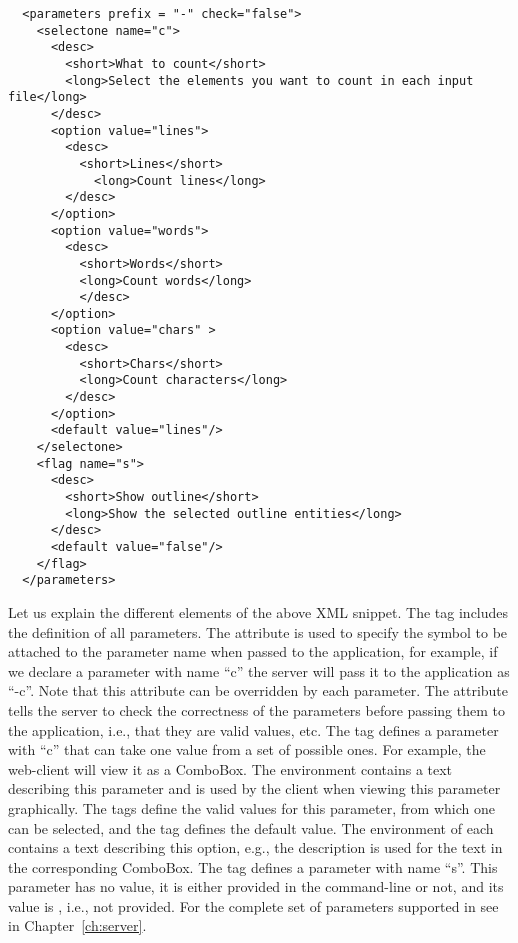 \medskip
\begin{lstlisting}
  <parameters prefix = "-" check="false">
    <selectone name="c">
      <desc>
        <short>What to count</short>
        <long>Select the elements you want to count in each input file</long>
      </desc>
      <option value="lines">
        <desc>
          <short>Lines</short>
            <long>Count lines</long>
        </desc>
      </option>
      <option value="words">
        <desc>
          <short>Words</short>
          <long>Count words</long>
          </desc>
      </option>
      <option value="chars" >
        <desc>
          <short>Chars</short>
          <long>Count characters</long>
        </desc>
      </option>
      <default value="lines"/>
    </selectone>
    <flag name="s">
      <desc>
        <short>Show outline</short>
        <long>Show the selected outline entities</long>
      </desc>
      <default value="false"/>
    </flag>
  </parameters>
\end{lstlisting}

\medskip
\noindent
Let us explain the different elements of the above XML snippet. 
%
The tag  includes the definition of all
parameters. The attribute  is used to specify the symbol
to be attached to the parameter name when passed to the application,
for example, if we declare a parameter with name ``c'' the server will
pass it to the application as ``-c''. Note that this attribute can be
overridden by each parameter.
%
The attribute  tells the server to check the correctness of
the parameters before passing them to the application, i.e., that they
are valid values, etc.
%
The tag  defines a parameter with  ``c'' that
can take one value from a set of possible ones. For example, the
web-client will view it as a ComboBox.
%
The  environment contains a text describing this parameter
and is used by the client when viewing this parameter graphically.
%
The  tags define the valid values for this parameter, from
which one can be selected, and the  tag defines the
default value.  The  environment of each 
contains a text describing this option, e.g., the 
description is used for the text in the corresponding ComboBox.
%
The tag  defines a parameter with name ``s''. This parameter
has no value, it is either provided in the command-line or not, and
its  value is , i.e., not provided. For the
complete set of parameters supported in \ei see
 in Chapter~\ref{ch:server}.

